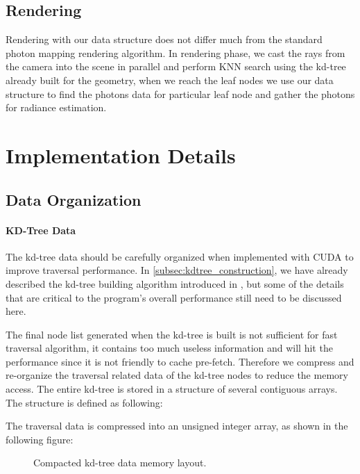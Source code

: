 \subsection{Rendering} 

Rendering with our data structure does not differ much from the standard photon mapping rendering algorithm. In rendering phase, we cast the rays from the camera into the scene in parallel and perform KNN search using the kd-tree already built for the geometry, when we reach the leaf nodes we use our data structure to find the photons data for particular leaf node and gather the photons for radiance estimation. 

\section{Implementation Details} 
\label{sec:impl_detials} 

\subsection{Data Organization} 
\label{subsec:data_org}

\paragraph{KD-Tree Data} 

The kd-tree data should be carefully organized when implemented with CUDA to improve traversal performance. In \ref{subsec:kdtree_construction}, we have already described the kd-tree building algorithm introduced in \cite{Zhou2008}, but some of the details that are critical to the program's overall performance still need to be discussed here. 

The final node list generated when the kd-tree is built is not sufficient for fast traversal algorithm, it contains too much useless information and will hit the performance since it is not friendly to cache pre-fetch. Therefore we compress and re-organize the traversal related data of the kd-tree nodes to reduce the memory access. The entire kd-tree is stored in a structure of several contiguous arrays. The structure is defined as following:  

 

The traversal data is compressed into an unsigned integer array, as shown in the following figure: 

\begin{figure}[htp] 
    \centering 
    \renewcommand{\thefigure}{\thechapter.\arabic{figure}}
    \caption[]{Compacted kd-tree data memory layout.}
    \label{fig:kdtree_data_memory_layout} 
\end{figure}  

